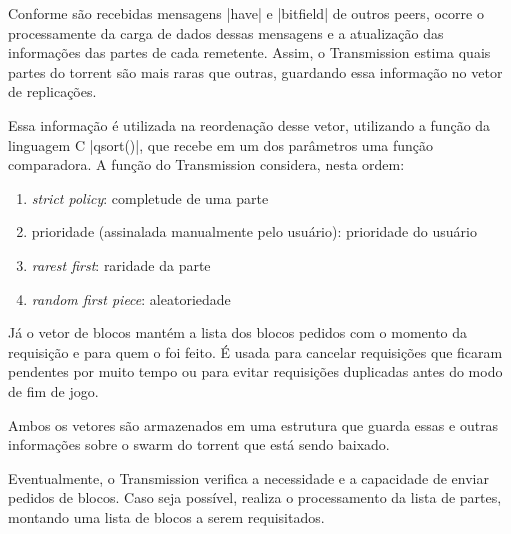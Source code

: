 
Conforme são recebidas mensagens \bverb|have| e \bverb|bitfield| de outros \glspl*{peer},
ocorre o processamente da carga de dados dessas mensagens e a atualização das
informações das partes de cada remetente. Assim, o Transmission estima quais partes do
\gls*{torrent} são mais raras que outras, guardando essa informação no vetor de
replicações.


Essa informação é utilizada na reordenação desse vetor, utilizando a função da linguagem
C \sverb|qsort()|, que recebe em um dos parâmetros uma função comparadora. A função do
Transmission considera, nesta ordem:

\begin{enumerate}
    \item \emph{strict policy}: completude de uma parte
    \item prioridade (assinalada manualmente pelo usuário): prioridade do usuário
    \item \emph{rarest first}: raridade da parte
    \item \emph{random first piece}: aleatoriedade
\end{enumerate}


Já o vetor de blocos mantém a lista dos blocos pedidos com o momento da requisição e
para quem o foi feito. É usada para cancelar requisições que ficaram pendentes por muito
tempo ou para evitar requisições duplicadas antes do modo de fim de jogo.


Ambos os vetores são armazenados em uma estrutura que guarda essas e outras informações
sobre o \gls*{swarm} do \gls*{torrent} que está sendo baixado.


Eventualmente, o Transmission verifica a necessidade e a capacidade de enviar pedidos
de blocos. Caso seja possível, realiza o processamento da lista de partes, montando uma
lista de blocos a serem requisitados.

\newpage
{}


